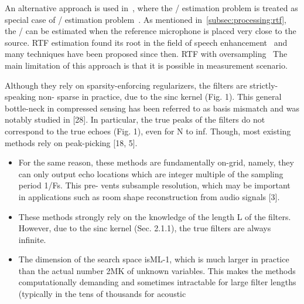 \mynewline
An alternative approach is used in~, where the \RIR/ estimation problem is treated as special case of \RTF/ estimation problem~.
As mentioned in~\cref{subsec:processing:rtf}, the \RTF/ can be estimated when the reference microphone is placed very close to the source.
RTF estimation found its root in the field of speech enhancement~ and many techniques have been proposed since then.
RTF with oversampling~
The main limitation of this approach is that it is possible in measurement scenario.

Although they rely on sparsity-enforcing regularizers, the filters are strictly-speaking non- sparse in practice, due to the sinc kernel (Fig. 1).
This general bottle-neck in compressed sensing has been referred to as basis mismatch and was notably studied in [28]. In particular, the true peaks of the filters do not correspond to the true echoes (Fig. 1), even for N to inf. Though, most existing methods rely on peak-picking [18, 5].
\begin{itemize}
    \item For the same reason, these methods are fundamentally on-grid, namely, they can only output echo locations which are integer multiple of the sampling period 1/Fs. This pre- vents subsample resolution, which may be important in applications such as room shape reconstruction from audio signals [3].
    \item These methods strongly rely on the knowledge of the length L of the filters. However, due to the sinc kernel (Sec. 2.1.1), the true filters are always infinite.
    \item The dimension of the search space isML-1, which is much larger in practice than the actual number 2MK of unknown variables. This makes the methods computationally demanding and sometimes intractable for large filter lengths (typically in the tens of thousands for acoustic
\end{itemize}


